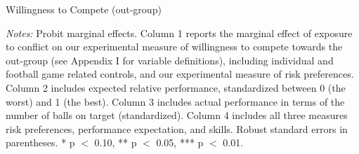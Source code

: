 \documentclass[10pt,a4paper]{scrartcl} %
\begin{document}
\pagebreak

\begin{table}[htp]
  \caption{Willingness to Compete (out-group)}
  \label{tab:slf:compete_abl}
\begin{threeparttable}[p!]

  \singlespacing
  \small
  
  \begin{tablenotes}
    \footnotesize
    \item \textit{Notes:} Probit marginal effects. Column 1 reports the marginal effect of exposure to conflict on our experimental measure of willingness to compete towards the out-group (see Appendix I for variable definitions), including individual and football game related controls, and our experimental measure of risk preferences. Column 2 includes expected relative performance, standardized between 0 (the worst) and 1 (the best). Column 3 includes actual performance in terms of the number of balls on target (standardized). Column 4 includes all three measures risk preferences, performance expectation, and skills. Robust standard errors in parentheses.  * p $<$ 0.10, ** p $<$ 0.05, *** p $<$ 0.01.
    \item
  \end{tablenotes}
\end{threeparttable}
\end{table}

\clearpage


\end{document}
